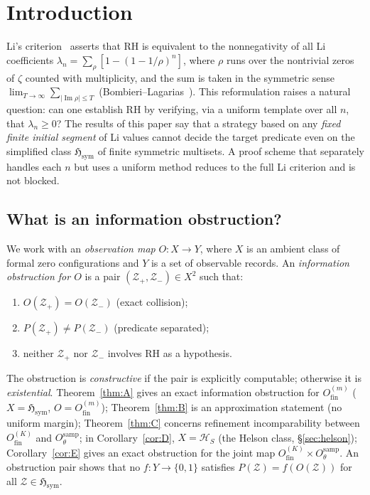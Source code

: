 \documentclass[12pt]{amsart}
\theoremstyle{definition}
\theoremstyle{remark}
\theoremstyle{plain}
\newcommand{\Hsym}{\mathfrak{H}_{\mathrm{sym}}}
\newcommand{\Ofinite}{O_{\mathrm{fin}}}
\newcommand{\Otheta}{O_{\theta}^{\mathrm{samp}}}
\newcommand{\im}{\operatorname{Im}}
\begin{document}
\maketitle
\tableofcontents

\section{Introduction}

Li's criterion~\cite{Li1997} asserts that RH is equivalent to the
nonnegativity of all Li coefficients
$\lambda_n = \sum_\rho [1-(1-1/\rho)^n]$,
where $\rho$ runs over the nontrivial zeros of $\zeta$ counted with
multiplicity, and the sum is taken in the symmetric sense
$\lim_{T\to\infty}\sum_{|\im\rho|\leq T}$
(Bombieri--Lagarias~\cite{BombieriLagarias1999}).
This reformulation raises a natural question: can one establish RH by
verifying, via a uniform template over all $n$, that $\lambda_n \geq 0$?
The results of this paper say that a strategy based on any \emph{fixed
finite initial segment} of Li values cannot decide the target predicate even on
the simplified class $\Hsym$ of finite symmetric multisets.  A proof scheme
that separately handles each $n$ but uses a uniform method reduces to the
full Li criterion and is not blocked.

\subsection*{What is an information obstruction?}

We work with an \emph{observation map} $O : X \to Y$, where $X$ is an
ambient class of formal zero configurations and $Y$ is a set of observable
records.  An \emph{information obstruction for $O$} is a
pair $(\mathcal{Z}_+, \mathcal{Z}_-) \in X^2$ such that:
\begin{enumerate}[label=(\roman*)]
  \item $O(\mathcal{Z}_+) = O(\mathcal{Z}_-)$ (exact collision);
  \item $P(\mathcal{Z}_+) \neq P(\mathcal{Z}_-)$ (predicate separated);
  \item neither $\mathcal{Z}_+$ nor $\mathcal{Z}_-$ involves RH as a hypothesis.
\end{enumerate}
The obstruction is \emph{constructive} if the pair is explicitly computable;
otherwise it is \emph{existential}.
Theorem~\ref{thm:A} gives an exact information obstruction for $\Ofinite^{(m)}$
($X=\Hsym$, $O=\Ofinite^{(m)}$); Theorem~\ref{thm:B} is an approximation statement
(no uniform margin); Theorem~\ref{thm:C} concerns refinement incomparability between
$\Ofinite^{(K)}$ and $\Otheta$; in Corollary~\ref{cor:D}, $X=\mathcal{H}_S$ (the Helson class,
\S\ref{sec:helson}); Corollary~\ref{cor:E} gives an exact obstruction for the joint
map $\Ofinite^{(K)}\times\Otheta$.
An obstruction pair shows that no $f : Y \to \{0,1\}$ satisfies
$P(\mathcal{Z}) = f(O(\mathcal{Z}))$ for all $\mathcal{Z}\in\Hsym$.
\end{document}

